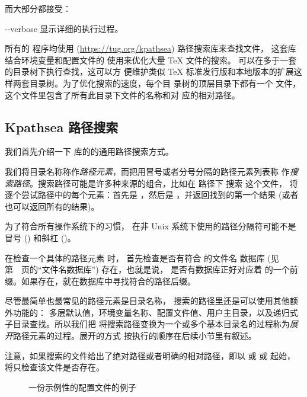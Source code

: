 \documentclass{article}
\begin{document}
而大部分都接受：
\begin{ttdescription}
  \item[-{}-verbose] 显示详细的执行过程。
\end{ttdescription}

所有的 \Webc{} 程序均使用 \KPS{} (\url{https://tug.org/kpathsea}) 路径搜索库来查找文件，
这套库结合环境变量和配置文件的
使用来优化大量 \TeX{} 文件的搜索。\Webc{} 可以在多于一套的目录树下执行查找，这可以方
便维护类似 \TeX{} 标准发行版和本地版本的扩展这样两套目录树。为了优化搜索的速度，每个目
录树的顶层目录下都有一个  文件，这个文件里包含了所有此目录下文件的名称和对
应的相对路径。

\subsection{Kpathsea 路径搜索}
\label{sec:kpathsea}

我们首先介绍一下 \KPS{} 库的的通用路径搜索方式。

我们将目录名称称作\emph{路径元素}，而把用冒号或者分号分隔的路径元素列表称
作\emph{搜索路径}。搜索路径可能是许多种来源的组合，比如在  路径下
搜索  这个文件，\KPS{} 将逐个尝试路径中的每个元素：首先是
，然后是 ，并返回找到的第一个结果 (或者
也可以返回所有的结果)。

为了符合所有操作系统下的习惯，\KPS{} 在非 Unix 系统下使用的路径分隔符可能不是冒号
(\samp{:}) 和斜杠 (\samp{/})。

在检查一个具体的路径元素  时，\KPS{} 首先检查是否有符合  的文件名
数据库 (见第~\pageref{sec:filename-database}~页的``文件名数据库'') 存在，也就是说，
是否有数据库正好对应着  的一个前缀。如果存在，就在数据库中寻找符合的路径后缀。

尽管最简单也最常见的路径元素是目录名称，\KPS{} 搜索的路径里还是可以使用其他额外功能的：
多层默认值，环境变量名称、配置文件值、用户主目录，以及递归式子目录查找。所以我们把 \KPS{}
将搜索路径变换为一个或多个基本目录名的过程称为\emph{展开}路径元素的过程。展开的方式
按执行的顺序在后续小节里有叙述。

注意，如果搜索的文件给出了绝对路径或者明确的相对路径，即以 \samp{/} 或  或
 起始，\KPS{} 将只检查该文件是否存在。

\ifSingleColumn
\else
  \begin{figure*}
    
    \setlength{\abovecaptionskip}{0pt}
    \caption{一份示例性的配置文件的例子}
    \label{fig:config-sample}
  \end{figure*}
\fi
\end{document}
